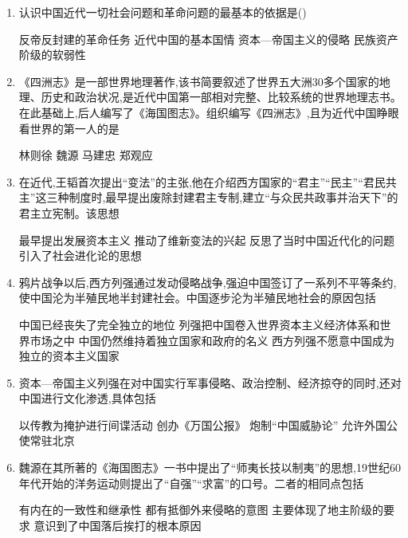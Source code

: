 \documentclass[12pt, a4paper, oneside, UTF8]{ctexbook}
\begin{document}
\begin{enumerate}
    \item 认识中国近代一切社会问题和革命问题的最基本的依据是(\qquad)
    \begin{choices}[1]
    \task 反帝反封建的革命任务
    \task 近代中国的基本国情
    \task 资本—帝国主义的侵略
    \task 民族资产阶级的软弱性
    \end{choices}
    \item 《四洲志》是一部世界地理著作,该书简要叙述了世界五大洲30多个国家的地理、历史和政治状况,是近代中国第一部相对完整、比较系统的世界地理志书。在此基础上,后人编写了《海国图志》。组织编写《四洲志》,且为近代中国睁眼看世界的第一人的是
    \begin{choices}
    \task 林则徐
    \task 魏源
    \task 马建忠
    \task 郑观应
    \end{choices}
    \item 在近代,王韬首次提出“变法”的主张,他在介绍西方国家的“君主”“民主”“君民共主”这三种制度时,最早提出废除封建君主专制,建立“与众民共政事并治天下”的君主立宪制。该思想
    \begin{choices}[1]
    \task 最早提出发展资本主义
    \task 推动了维新变法的兴起
    \task 反思了当时中国近代化的问题
    \task 引入了社会进化论的思想
    \end{choices}

    \item \bl 鸦片战争以后,西方列强通过发动侵略战争,强迫中国签订了一系列不平等条约,使中国沦为半殖民地半封建社会。中国逐步沦为半殖民地社会的原因包括
    \begin{choices}[1]
    \task 中国已经丧失了完全独立的地位
    \task 列强把中国卷入世界资本主义经济体系和世界市场之中
    \task 中国仍然维持着独立国家和政府的名义
    \task 西方列强不愿意中国成为独立的资本主义国家
    \end{choices}

    \item \bl 资本—帝国主义列强在对中国实行军事侵略、政治控制、经济掠夺的同时,还对中国进行文化渗透,具体包括
    \begin{choices}[2]
    \task 以传教为掩护进行间谍活动
    \task 创办《万国公报》
    \task 炮制“中国威胁论”
    \task 允许外国公使常驻北京
    \end{choices}

    \item \bl 魏源在其所著的《海国图志》一书中提出了“师夷长技以制夷”的思想,19世纪60年代开始的洋务运动则提出了“自强”“求富”的口号。二者的相同点包括
    \begin{choices}[1]
    \task 有内在的一致性和继承性
    \task 都有抵御外来侵略的意图
    \task 主要体现了地主阶级的要求
    \task 意识到了中国落后挨打的根本原因
    \end{choices}


\end{enumerate}
\end{document}
